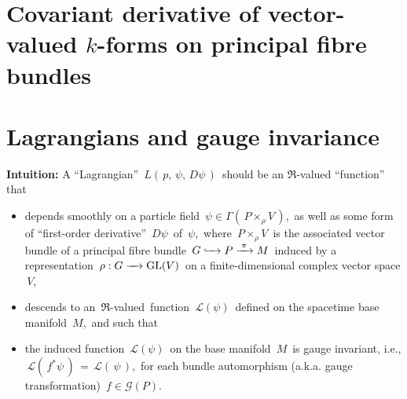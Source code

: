 
\vskip 0.5cm
\section{Covariant derivative of vector-valued $k$-forms on principal fibre bundles}


\vskip 0.5cm
\section{Lagrangians and gauge invariance}


\vskip 0.3cm
\noindent
\textbf{Intuition:}
\vskip 0.2cm
\noindent
A ``Lagrangian'' \,$L(\,p,\,\psi,\,D\psi\,)$\,
should be an $\Re$-valued ``function'' that
\begin{itemize}
\item
    \vskip -0.1cm
    depends smoothly on a particle field
    \,$\psi \in \Gamma\!\left(\,P \times_{\rho} V\,\right)$,\,
    as well as some form of ``{\color{red}first-order derivative}'' \,$D\psi$\, of \,$\psi$,\,
    where \,$P \times_{\rho} V$\, is the associated vector bundle
    of a principal fibre bundle
    \,$G \xhookrightarrow{{\color{white}....}} P \xrightarrow{{\color{white}.}\pi{\color{white}.}} M$\,
    induced by a representation \,$\rho : G \xrightarrow{{\color{white}....}} \GL(V)$\,
    on a finite-dimensional complex vector space \,$V$,\,
\item
    {\color{red}descends} to an \,$\Re$-valued\, function
    \,$\mathscr{L}(\psi)$\,
    defined on the spacetime base manifold \,$M$,\,
    and such that
\item
    the induced function
    \,$\mathscr{L}(\psi)$\,
    on the base manifold \,$M$\,
    is {\color{red}gauge invariant}, i.e.,
    \,$\mathscr{L}(\,f^{*}\psi\,) \, = \, \mathscr{L}(\,\psi\,)$,\,
    for each bundle automorphism (a.k.a. gauge transformation)
    \,$f \in \mathscr{G}(P)$.\,
\end{itemize}


